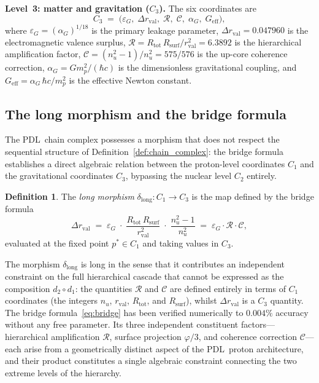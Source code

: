 \documentclass[11pt,a4paper]{article}
\theoremstyle{definition}
\newtheorem{definition}[theorem]{Definition}
\newcommand{\PDL}{\textnormal{PDL}}
\newcommand{\Rsurf}{R_{\mathrm{surf}}}
\newcommand{\Rtot}{R_{\mathrm{tot}}}
\newcommand{\rval}{r_{\mathrm{val}}}
\newcommand{\epsg}{\varepsilon_G}
\newcommand{\dmap}[1]{d_{#1}}
\newcommand{\dlong}{\delta_{\mathrm{long}}}
\newcommand{\calR}{\mathcal{R}}
\newcommand{\calC}{\mathcal{C}}
\newcommand{\vp}{\varphi}
\begin{document}
\medskip\noindent\textbf{Level~3: matter and gravitation ($C_3$).} The six coordinates are
\[
  C_3 \;=\; \bigl(\epsg,\; \Delta\rval,\; \calR,\; \calC,\; \alpha_G,\; G_{\mathrm{eff}}\bigr),
\]
where $\epsg = (\alpha_G)^{1/18}$ is the primary leakage parameter, $\Delta\rval = 0.047960$ is the electromagnetic valence surplus, $\calR = \Rtot\,\Rsurf/\rval^2 = 6.3892$ is the hierarchical amplification factor, $\calC = (n_u^2-1)/n_u^2 = 575/576$ is the up-core coherence correction, $\alpha_G = G m_p^2/(\hbar c)$ is the dimensionless gravitational coupling, and $G_{\mathrm{eff}} = \alpha_G\,\hbar c/m_p^2$ is the effective Newton constant.\cite{Bridge_Formula_PDL_2026}

\subsection{The long morphism and the bridge formula}
\label{subsec:long}

The \PDL\ chain complex possesses a morphism that does not respect the sequential structure of Definition~\ref{def:chain_complex}: the bridge formula establishes a direct algebraic relation between the proton-level coordinates $C_1$ and the gravitational coordinates $C_3$, bypassing the nuclear level $C_2$ entirely.

\begin{definition}
  \label{def:long_morphism}
  The \emph{long morphism} $\dlong : C_1 \to C_3$ is the map defined by the bridge formula\cite{Bridge_Formula_PDL_2026}
  \begin{equation}
    \label{eq:bridge}
    \Delta\rval \;=\; \epsg \;\cdot\; \frac{\Rtot\,\Rsurf}{\rval^2} \;\cdot\; \frac{n_u^2 - 1}{n_u^2} \;=\; \epsg \cdot \calR \cdot \calC,
  \end{equation}
  evaluated at the fixed point $p^* \in C_1$ and taking values in $C_3$.
\end{definition}

The morphism $\dlong$ is long in the sense that it contributes an independent constraint on the full hierarchical cascade that cannot be expressed as the composition $\dmap{2} \circ \dmap{1}$: the quantities $\calR$ and $\calC$ are defined entirely in terms of $C_1$ coordinates (the integers $n_u$, $\rval$, $\Rtot$, and $\Rsurf$), whilst $\Delta\rval$ is a $C_3$ quantity. The bridge formula~\eqref{eq:bridge} has been verified numerically to $0.004\%$ accuracy without any free parameter.\cite{Bridge_Formula_PDL_2026} Its three independent constituent factors---hierarchical amplification $\calR$, surface projection $\vp/3$, and coherence correction $\calC$---each arise from a geometrically distinct aspect of the \PDL\ proton architecture, and their product constitutes a single algebraic constraint connecting the two extreme levels of the hierarchy.
\end{document}
